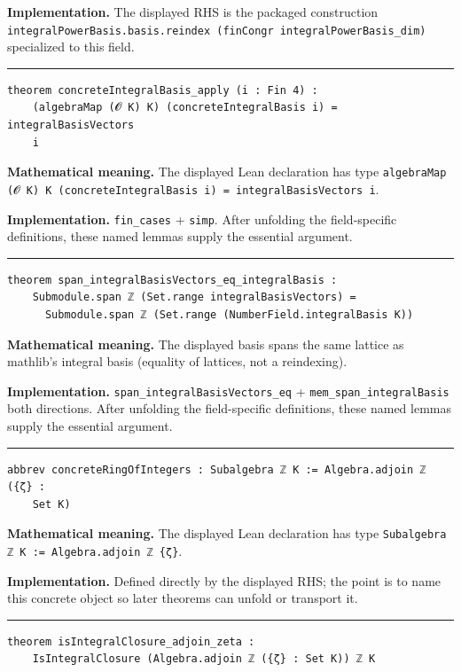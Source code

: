 \documentclass[UTF8,a4paper,11pt,fontset=fandol]{ctexart}
\theoremstyle{definition}
\newcommand{\statementsep}{\par\medskip\hrule\medskip}
\begin{document}
\noindent\textbf{Implementation.} The displayed RHS is the packaged construction \texttt{integralPowerBasis.\allowbreak{}basis.\allowbreak{}reindex (finCongr integralPowerBasis\_\allowbreak{}dim)} specialized to this field.\par
\statementsep
\begin{verbatim}
theorem concreteIntegralBasis_apply (i : Fin 4) :
    (algebraMap (𝓞 K) K) (concreteIntegralBasis i) = integralBasisVectors
    i
\end{verbatim}
\noindent\textbf{Mathematical meaning.} The displayed Lean declaration has type \texttt{algebraMap (𝓞 K) K (concreteIntegralBasis i) = integralBasisVectors i}.\par
\noindent\textbf{Implementation.} \texttt{fin\_\allowbreak{}cases} + \texttt{simp}. After unfolding the field-specific definitions, these named lemmas supply the essential argument.\par
\statementsep
\begin{verbatim}
theorem span_integralBasisVectors_eq_integralBasis :
    Submodule.span ℤ (Set.range integralBasisVectors) =
      Submodule.span ℤ (Set.range (NumberField.integralBasis K))
\end{verbatim}
\noindent\textbf{Mathematical meaning.} The displayed basis spans the same lattice as mathlib's integral basis (equality of lattices, not a reindexing).\par
\noindent\textbf{Implementation.} \texttt{span\_\allowbreak{}integralBasisVectors\_\allowbreak{}eq} + \texttt{mem\_\allowbreak{}span\_\allowbreak{}integralBasis} both directions. After unfolding the field-specific definitions, these named lemmas supply the essential argument.\par
\statementsep
\begin{verbatim}
abbrev concreteRingOfIntegers : Subalgebra ℤ K := Algebra.adjoin ℤ ({ζ} :
    Set K)
\end{verbatim}
\noindent\textbf{Mathematical meaning.} The displayed Lean declaration has type \texttt{Subalgebra ℤ K := Algebra.\allowbreak{}adjoin ℤ \{ζ\}}.\par
\noindent\textbf{Implementation.} Defined directly by the displayed RHS; the point is to name this concrete object so later theorems can unfold or transport it.\par
\statementsep
\begin{verbatim}
theorem isIntegralClosure_adjoin_zeta :
    IsIntegralClosure (Algebra.adjoin ℤ ({ζ} : Set K)) ℤ K
\end{verbatim}
\end{document}

